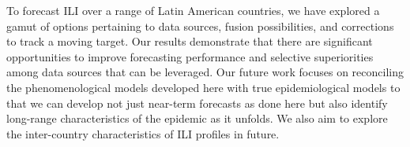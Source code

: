 To forecast ILI over a range of Latin American countries, we have
explored a gamut of options pertaining to data sources, fusion
possibilities, and corrections to track a moving target. Our results
demonstrate that there are significant opportunities to improve
forecasting performance and selective superiorities among data sources
that can be leveraged.  Our future work focuses on reconciling the
phenomenological models developed here with true epidemiological models
to that we can develop not just near-term forecasts as done here but
also identify long-range characteristics of the epidemic as it unfolds.
We also aim to explore the inter-country characteristics of ILI
profiles in future.
